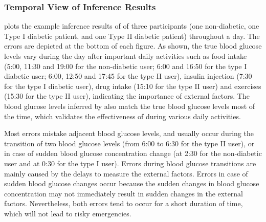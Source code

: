 \subsubsection{Temporal View of Inference Results}
 plots the example inference results of \sysname of three participants (one non-diabetic, one Type I diabetic patient, and one Type II diabetic patient) throughout a day.
The errors are depicted at the bottom of each figure.
As shown, the true blood glucose levels vary during the day after important daily activities such as food intake (5:00, 11:30 and 19:00 for the non-diabetic user; 6:00 and 16:50 for the type I diabetic user; 6:00, 12:50 and 17:45 for the type II user), insulin injection (7:30 for the type I diabetic user), drug intake (15:10 for the type II user) and exercises (15:30 for the type II user), indicating the importance of external factors.
The blood glucose levels inferred by \sysname also match the true blood glucose levels most of the time, which validates the effectiveness of \sysname during various daily activities.

Most errors mistake adjacent blood glucose levels, and usually occur during the transition of two blood glucose levels (\eg from 6:00 to 6:30 for the type II user), or in case of sudden blood glucose concentration change (\eg at 2:30 for the non-diabetic user and at 0:30 for the type I user).
Errors during blood glucose transitions are mainly caused by the delays to measure the external factors.
Errors in case of sudden blood glucose changes occur because the sudden changes in blood glucose concentration may not immediately result in sudden changes in the external factors.
Nevertheless, both errors tend to occur for a short duration of time, which will not lead to risky emergencies.




